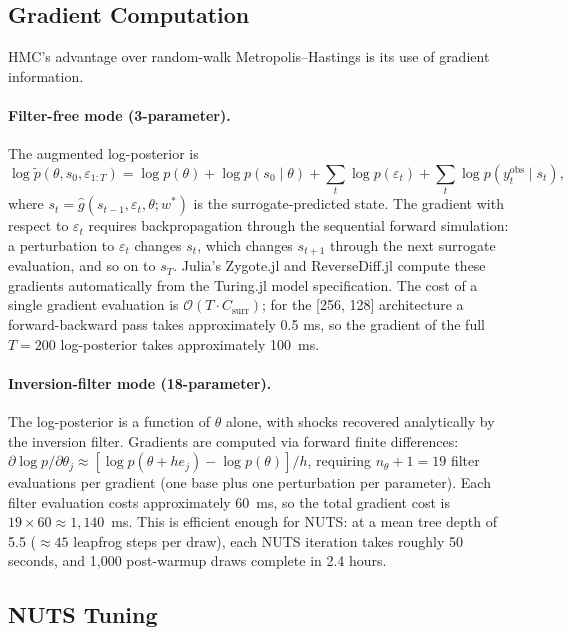 \documentclass[12pt]{article}
\theoremstyle{plain}
\theoremstyle{definition}
\theoremstyle{remark}
\begin{document}
\subsection{Gradient Computation}

HMC's advantage over random-walk Metropolis--Hastings is its use of gradient information.

\paragraph{Filter-free mode (3-parameter).} The augmented log-posterior is
\[
\log \tilde{p}(\theta, s_0, \varepsilon_{1:T}) = \log p(\theta) + \log p(s_0 \mid \theta) + \sum_t \log p(\varepsilon_t) + \sum_t \log p(y_t^{\text{obs}} \mid s_t),
\]
where $s_t = \hat{g}(s_{t-1}, \varepsilon_t, \theta; w^*)$ is the surrogate-predicted state. The gradient with respect to $\varepsilon_t$ requires backpropagation through the sequential forward simulation: a perturbation to $\varepsilon_t$ changes $s_t$, which changes $s_{t+1}$ through the next surrogate evaluation, and so on to $s_T$. Julia's Zygote.jl and ReverseDiff.jl compute these gradients automatically from the Turing.jl model specification. The cost of a single gradient evaluation is $\mathcal{O}(T \cdot C_{\text{surr}})$; for the [256, 128] architecture a forward-backward pass takes approximately 0.5 ms, so the gradient of the full $T=200$ log-posterior takes approximately 100~ms.

\paragraph{Inversion-filter mode (18-parameter).} The log-posterior is a function of $\theta$ alone, with shocks recovered analytically by the inversion filter. Gradients are computed via forward finite differences: $\partial \log p / \partial \theta_j \approx [\log p(\theta + h e_j) - \log p(\theta)] / h$, requiring $n_\theta + 1 = 19$ filter evaluations per gradient (one base plus one perturbation per parameter). Each filter evaluation costs approximately 60~ms, so the total gradient cost is $19 \times 60 \approx 1{,}140$~ms. This is efficient enough for NUTS: at a mean tree depth of 5.5 ($\approx 45$ leapfrog steps per draw), each NUTS iteration takes roughly 50 seconds, and 1,000 post-warmup draws complete in 2.4 hours.


\subsection{NUTS Tuning}
\end{document}
